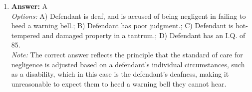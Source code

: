 \documentclass[12pt]{article}
\begin{document}
\begin{enumerate}[label=\arabic*.]
\\ \textit{Options:} A) Executive agreements, U.S. Constitution, treaties and federal statutes, state law; B) U.S constitution, treaties and federal statutes, executive agreements, state law; C) Treaties and federal statutes, US Constitution, executive agreements, state law; D) U.S constitution, executive agreements, treaties and federal statutes, state law
\\ \textit{Note:} This answer is correct because it reflects the supremacy clause in the U.S. Constitution, which establishes that the Constitution is the highest law of the land, followed by treaties and federal statutes, with executive agreements and state laws being subordinate to these higher forms of law.
\item \textbf{Answer:} A
\\ \textit{Options:} A) Defendant is deaf, and is accused of being negligent in failing to heed a warning bell.; B) Defendant has poor judgment.; C) Defendant is hot-tempered and damaged property in a tantrum.; D) Defendant has an I.Q. of 85.
\\ \textit{Note:} The correct answer reflects the principle that the standard of care for negligence is adjusted based on a defendant's individual circumstances, such as a disability, which in this case is the defendant's deafness, making it unreasonable to expect them to heed a warning bell they cannot hear.
\end{enumerate}
\end{document}
